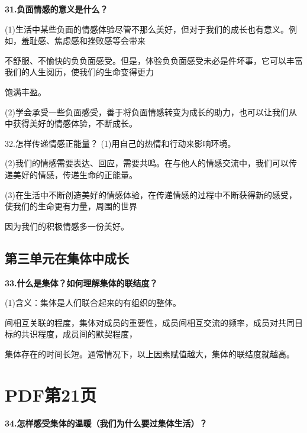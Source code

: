 \documentclass[lang=cn,11pt]{elegantbook}
\begin{document}
\textbf{31.负面情感的意义是什么？}\par

(1)生活中某些负面的情感体验尽管不那么美好，但对于我们的成长也有意义。例如，羞耻感、焦虑感和挫败感等会带来\par

不舒服、不愉快的负负面感受。但是，体验负负面感受未必是件坏事，它可以丰富我们的人生阅历，使我们的生命变得更力\par

饱满丰盈。\par

(2)学会承受一些负面感受，善于将负面情感转变为成长的助力，也可以让我们从中获得美好的情感体验，不断成长。\par

32.怎样传递情感正能量？ (1)用自己的热情和行动来影响环境。\par

(2)我们的情感需要表达、回应，需要共鸣。在与他人的情感交流中，我们可以传递美好的情感，传递生命的正能量。\par

(3)在生活中不断创造美好的情感体验，在传递情感的过程中不断获得新的感受，使我们的生命更有力量，周围的世界\par

因为我们的积极情感多一份美好。\par

\subsection*{第三单元在集体中成长}

\textbf{33.什么是集体？如何理解集体的联结度？}\par

(1)含义：集体是人们联合起来的有组织的整体。\par

间相互关联的程度，集体对成员的重要性，成员间相互交流的频率，成员对共同目标的共识程度，成员间的默契程度，\par

集体存在的时间长短。通常情况下，以上因素赋值越大，集体的联结度就越高。\par


\section*{PDF第21页}

\textbf{34.怎样感受集体的温暖（我们为什么要过集体生活）？}\par
\end{document}
